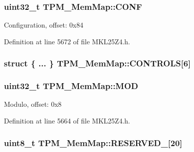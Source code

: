 \subsubsection[{\texorpdfstring{C\+O\+NF}{CONF}}]{\setlength{\rightskip}{0pt plus 5cm}uint32\+\_\+t T\+P\+M\+\_\+\+Mem\+Map\+::\+C\+O\+NF}\hypertarget{struct_t_p_m___mem_map_ad54647b8ab5b1dab6948a3d5a13ea8d7}{}\label{struct_t_p_m___mem_map_ad54647b8ab5b1dab6948a3d5a13ea8d7}
Configuration, offset\+: 0x84 

Definition at line 5672 of file M\+K\+L25\+Z4.\+h.

\subsubsection[{\texorpdfstring{C\+O\+N\+T\+R\+O\+LS}{CONTROLS}}]{\setlength{\rightskip}{0pt plus 5cm}struct \{ ... \}   T\+P\+M\+\_\+\+Mem\+Map\+::\+C\+O\+N\+T\+R\+O\+LS\mbox{[}6\mbox{]}}\hypertarget{struct_t_p_m___mem_map_ae883c773f68fdd92b71722a745e48e17}{}\label{struct_t_p_m___mem_map_ae883c773f68fdd92b71722a745e48e17}
\subsubsection[{\texorpdfstring{M\+OD}{MOD}}]{\setlength{\rightskip}{0pt plus 5cm}uint32\+\_\+t T\+P\+M\+\_\+\+Mem\+Map\+::\+M\+OD}\hypertarget{struct_t_p_m___mem_map_af46c48b6009bc12f49d484ee9859bcf9}{}\label{struct_t_p_m___mem_map_af46c48b6009bc12f49d484ee9859bcf9}
Modulo, offset\+: 0x8 

Definition at line 5664 of file M\+K\+L25\+Z4.\+h.

\subsubsection[{\texorpdfstring{R\+E\+S\+E\+R\+V\+E\+D\+\_\+0}{RESERVED_0}}]{\setlength{\rightskip}{0pt plus 5cm}uint8\+\_\+t T\+P\+M\+\_\+\+Mem\+Map\+::\+R\+E\+S\+E\+R\+V\+E\+D\+\_\mbox{[}20\mbox{]}}\hypertarget{struct_t_p_m___mem_map_ab36427a89ccceaa5fce62275f286f205}{}\label{struct_t_p_m___mem_map_ab36427a89ccceaa5fce62275f286f205}



